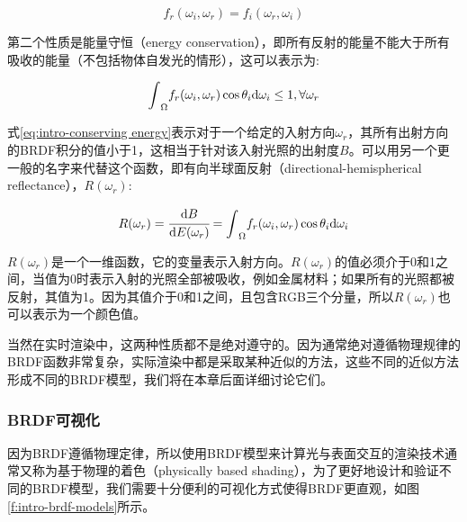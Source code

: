 \begin{equation}
	f_r(\omega_i,\omega_r)=f_i(\omega_r,\omega_i)
\end{equation}

第二个性质是能量守恒（energy conservation），即所有反射的能量不能大于所有吸收的能量（不包括物体自发光的情形），这可以表示为:

\begin{equation}\label{eq:intro-conserving energy}
	{\rm \int}_{\Omega}f_r(\omega_i,\omega_r)\cos\theta_i {\rm d}\omega_i \leq 1,\forall\omega_r
\end{equation}

式\ref{eq:intro-conserving energy}表示对于一个给定的入射方向$\omega_r$，其所有出射方向的BRDF积分的值小于1，这相当于针对该入射光照的出射度$B$。可以用另一个更一般的名字来代替这个函数，即有向半球面反射（directional-hemispherical reflectance），$R(\omega_r)$:

\begin{equation}
	R(\omega_r)= \cfrac{{\rm d}B}{{\rm d}E(\omega_r)}={\rm \int}_{\Omega}f_r(\omega_i,\omega_r)\cos\theta_i {\rm d}\omega_i
\end{equation}

\noindent $R(\omega_r)$是一个一维函数，它的变量表示入射方向。$R(\omega_r)$的值必须介于0和1之间，当值为0时表示入射的光照全部被吸收，例如金属材料；如果所有的光照都被反射，其值为1。因为其值介于0和1之间，且包含RGB三个分量，所以$R(\omega_r)$也可以表示为一个颜色值。

当然在实时渲染中，这两种性质都不是绝对遵守的。因为通常绝对遵循物理规律的BRDF函数非常复杂，实际渲染中都是采取某种近似的方法，这些不同的近似方法形成不同的BRDF模型，我们将在本章后面详细讨论它们。



\subsubsection{BRDF可视化}
因为BRDF遵循物理定律，所以使用BRDF模型来计算光与表面交互的渲染技术通常又称为基于物理的着色（physically based shading），为了更好地设计和验证不同的BRDF模型，我们需要十分便利的可视化方式使得BRDF更直观，如图\ref{f:intro-brdf-models}所示。

